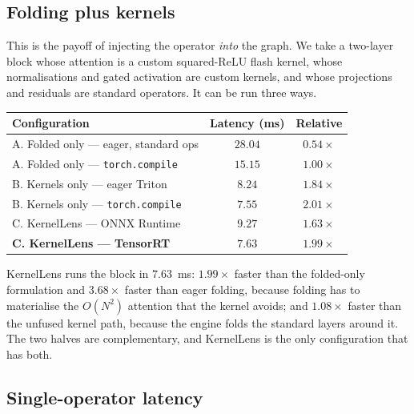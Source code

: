 \documentclass[11pt,a4paper]{article}
\begin{document}
\subsection{Folding plus kernels}

This is the payoff of injecting the operator \emph{into} the graph. We take a
two-layer block whose attention is a custom squared-ReLU flash kernel, whose
normalisations and gated activation are custom kernels, and whose projections and
residuals are standard operators. It can be run three ways.

\begin{center}
\small
\begin{tabular}{lc c}
\toprule
\textbf{Configuration} & \textbf{Latency (ms)} & \textbf{Relative} \\ \midrule
A. Folded only --- eager, standard ops & $28.04$ & $0.54\times$ \\
A. Folded only --- \texttt{torch.compile} & $15.15$ & $1.00\times$ \\ \midrule
B. Kernels only --- eager Triton & $8.24$ & $1.84\times$ \\
B. Kernels only --- \texttt{torch.compile} & $7.55$ & $2.01\times$ \\ \midrule
C. KernelLens --- ONNX Runtime & $9.27$ & $1.63\times$ \\
\textbf{C. KernelLens --- TensorRT} & $\mathbf{7.63}$ & $\mathbf{1.99\times}$ \\
\bottomrule
\end{tabular}
\label{tab:folding}
\end{center}

KernelLens runs the block in $7.63$~ms: $1.99\times$ faster than the folded-only
formulation and $3.68\times$ faster than eager folding, because folding has to
materialise the $O(N^2)$ attention that the kernel avoids; and $1.08\times$ faster
than the unfused kernel path, because the engine folds the standard layers around
it. The two halves are complementary, and KernelLens is the only configuration
that has both.

\subsection{Single-operator latency}
\end{document}
